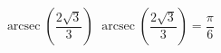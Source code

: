  {$\operatorname{arcsec} \left( \dfrac{2\sqrt{3}}{3} \right)$}
{ $\operatorname{arcsec} \left( \dfrac{2\sqrt{3}}{3} \right) = \dfrac{\pi}{6}$}
